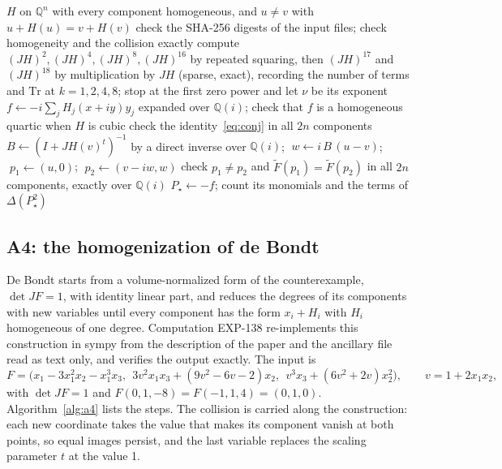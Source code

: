 \documentclass[11pt]{article}
\theoremstyle{remark}
\newcommand{\Q}{\mathbb{Q}}
\newcommand{\EXP}[1]{\mbox{EXP-#1}}
\begin{document}
\begin{algorithm}[t]
\caption{A3, symmetrization of $x+H$ and transport of a collision.}\label{alg:a3}
\begin{algorithmic}[1]
\Require $H$ on $\Q^n$ with every component homogeneous, and $u\ne v$ with $u+H(u)=v+H(v)$
\State check the SHA-256 digests of the input files; check homogeneity and the collision exactly
\State compute $(JH)^2,(JH)^4,(JH)^8,(JH)^{16}$ by repeated squaring, then $(JH)^{17}$ and $(JH)^{18}$ by multiplication by $JH$ (sparse, exact), recording the number of terms and $\mathrm{Tr}$ at $k=1,2,4,8$; stop at the first zero power and let $\nu$ be its exponent
\State $f\gets-i\sum_jH_j(x+iy)y_j$ expanded over $\Q(i)$; check that $f$ is a homogeneous quartic when $H$ is cubic
\State check the identity~\eqref{eq:conj} in all $2n$ components
\State $B\gets(I+JH(v)^t)^{-1}$ by a direct inverse over $\Q(i)$; $\;w\gets i\,B\,(u-v)$; $\;p_1\gets(u,0)$; $\;p_2\gets(v-iw,w)$
\State check $p_1\ne p_2$ and $\widetilde F(p_1)=\widetilde F(p_2)$ in all $2n$ components, exactly over $\Q(i)$
\State $P_\star\gets-f$; count its monomials and the terms of $\Delta(P_\star^2)$
\end{algorithmic}
\end{algorithm}

\subsection{A4: the homogenization of de Bondt}\label{sec:a4}

De Bondt starts from a volume-normalized form of the counterexample, $\det JF=1$, with identity linear part, and reduces the degrees of its components with new variables until every component has the form $x_i+H_i$ with $H_i$ homogeneous of one degree. Computation \EXP{138} re-implements this construction in sympy from the description of the paper and the ancillary file read as text only, and verifies the output exactly. The input is
\begin{equation}\label{eq:normalised}
F=\big(x_1-3x_1^2x_2-x_1^3x_3,\ \ 3v^2x_1x_3+(9v^2-6v-2)x_2,\ \ v^3x_3+(6v^2+2v)x_2^2\big),\qquad v=1+2x_1x_2,
\end{equation}
with $\det JF=1$ and $F(0,1,-8)=F(-1,1,4)=(0,1,0)$. Algorithm~\ref{alg:a4} lists the steps. The collision is carried along the construction: each new coordinate takes the value that makes its component vanish at both points, so equal images persist, and the last variable replaces the scaling parameter $t$ at the value 1.
\end{document}

